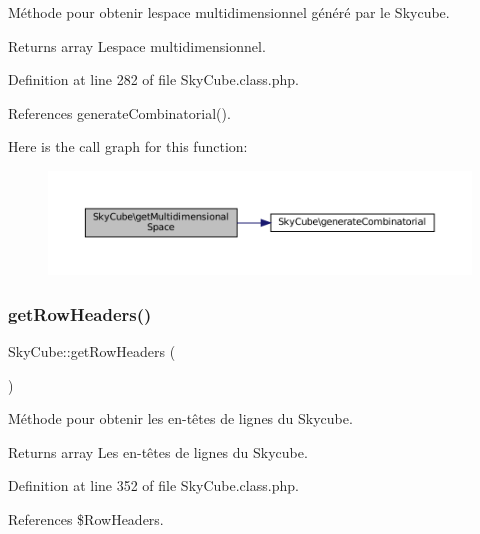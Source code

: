 Méthode pour obtenir l\textquotesingle{}espace multidimensionnel généré par le Skycube.

\begin{DoxyReturn}{Returns}
array L\textquotesingle{}espace multidimensionnel. 
\end{DoxyReturn}


Definition at line 282 of file Sky\+Cube.\+class.\+php.



References generate\+Combinatorial().

Here is the call graph for this function\+:\nopagebreak
\begin{figure}[H]
\begin{center}
\leavevmode
\includegraphics[width=350pt]{class_sky_cube_ad6426ecd7f39e86656afa4de4db347b5_cgraph}
\end{center}
\end{figure}
\mbox{\label{class_sky_cube_a8fe81d998c875dbd6921b709f9d464d6}} 
\subsubsection{\texorpdfstring{get\+Row\+Headers()}{getRowHeaders()}}
{\footnotesize\ttfamily Sky\+Cube\+::get\+Row\+Headers (\begin{DoxyParamCaption}{ }\end{DoxyParamCaption})}

Méthode pour obtenir les en-\/têtes de lignes du Skycube.

\begin{DoxyReturn}{Returns}
array Les en-\/têtes de lignes du Skycube. 
\end{DoxyReturn}


Definition at line 352 of file Sky\+Cube.\+class.\+php.



References \$\+Row\+Headers.

\mbox{\label{class_sky_cube_a315d9eb3672b81c5091139db449dd0ac}} 
